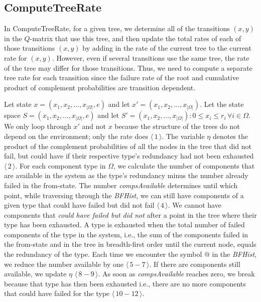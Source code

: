 \documentclass[12pt]{article}
\newcommand{\varName}[1]{\textrm{\it#1}}
\newcommand{\citeLine}[1]{$\langle\,#1\,\rangle$}
\newcommand{\citeBlock}[2]{$\langle\,#1 - #2\,\rangle$}
\begin{document}
\subsection{ComputeTreeRate}

In ComputeTreeRate, for a given tree, we determine all of the transitions $(x,y)$ in the $Q$-matrix that use this tree, and then update  the total rates of each of those transitions $(x,y)$ by adding in the rate of the current tree to the current rate for $(x,y)$. However, even if several transitions use the same tree, the rate of the tree may differ for those transitions. Thus, we need to compute a separate tree rate for each transition since the failure rate of the root and cumulative product of complement probabilities are transition dependent.

Let state $x = (x_{1}, x_{2}, \ldots, x_{|\Omega|}, e)$ and let $x' = (x_{1}, x_{2}, \ldots, x_{|\Omega|})$. Let the state space $S = (x_{1}, x_{2}, \ldots, x_{|\Omega|}, e)$ and let $S' = (x_{1}, x_{2}, \ldots, x_{|\Omega|}): 0 \leq x_{i} \leq r_{i} \, \forall i \in \Omega$. We only loop through $x'$ and not $x$ because the structure of the trees do not depend on the environment; only the rate does \citeLine{1}. The variable $\eta$ denotes the product of the complement probabilities of all the nodes in the tree that did not fail, but could have if their respective type's redundancy had not been exhausted \citeLine{2}. For each component type in $\Omega$, we calculate the number of components that are available in the system as the type's redundancy minus the number already failed in the from-state. The number \varName{compsAvailable} determines until which point, while traversing through the \varName{BFHist}, we can still have components of a given type that could have failed but did not fail \citeLine{4}. We cannot have components that \varName{could have failed but did not} after a point in the tree where their type has been exhausted. A type is exhausted when the total number of failed components of the type in the system, i.e., the sum of the components failed in the from-state and in the tree in breadth-first order until the current node, equals the redundancy of the type. Each time we encounter the symbol @ in the \varName{BFHist}, we reduce the number available by one \citeBlock{5}{7}. If there are components still available, we update $\eta$ \citeBlock{8}{9}. As soon as \varName{compsAvailable} reaches zero, we break because that type has then been exhausted i.e., there are no more components that could have failed for the type \citeBlock{10}{12}.
\end{document}
